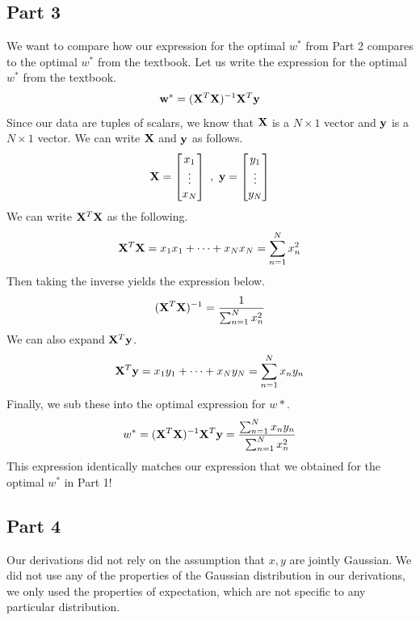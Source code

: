 \documentclass[submit]{harvardml}
\begin{document}
\subsection{Part 3}

We want to compare how our expression for the optimal $w^*$ from Part 2 compares to the optimal $w^*$ from the textbook.
Let us write the expression for the optimal $w^*$ from the textbook.
\begin{equation*}
    \vb{w}^* = (\vb{X}^T \vb{X})^{-1} \vb{X}^T \vb{y}
\end{equation*}
Since our data are tuples of scalars, we know that $\vb{X}$ is a $N \times 1$ vector and $\vb{y}$ is a $N \times 1$ vector. We can write $\vb{X}$ and $\vb{y}$ as follows.
\begin{equation*}
    \vb{X} =
        \begin{bmatrix}
            x_1\\
            \vdots\\
            x_N
        \end{bmatrix}
    \ , \
    \vb{y} = 
        \begin{bmatrix}
            y_1\\
            \vdots\\
            y_N
        \end{bmatrix}
\end{equation*}
We can write $\vb{X}^T \vb{X}$ as the following.
\begin{equation*}
    \vb{X}^T \vb{X} = x_1 x_1 + \cdots + x_N x_N = \sum_{n = 1}^N x_n^2
\end{equation*}
Then taking the inverse yields the expression below.
\begin{equation*}
    (\vb{X}^T \vb{X})^{-1} = \frac{1}{\sum_{n = 1}^N x_n^2}
\end{equation*}
We can also expand $\vb{X}^T \vb{y}$.
\begin{equation*}
    \vb{X}^T \vb{y} = x_1 y_1 + \cdots + x_N y_N = \sum_{n=1}^N x_n y_n
\end{equation*}
Finally, we sub these into the optimal expression for $w*$.
\begin{equation*}
    w^* = (\vb{X}^T \vb{X})^{-1} \vb{X}^T \vb{y} = \frac{\sum_{n=1}^N x_n y_n}{\sum_{n = 1}^N x_n^2}
\end{equation*}
This expression identically matches our expression that we obtained for the optimal $w^*$ in Part 1!

\subsection{Part 4}
Our derivations did not rely on the assumption that $x,y$ are jointly Gaussian. We did not use any of the properties of the Gaussian distribution in our derivations, we only used the properties of expectation, which are not specific to any particular distribution.
\end{document}
